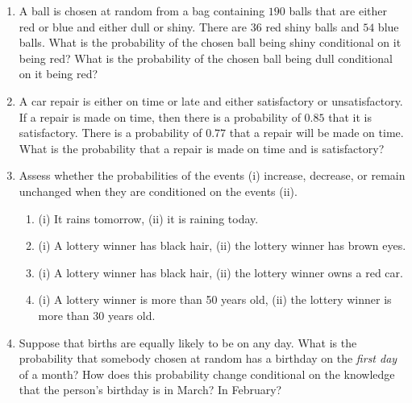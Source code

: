 \documentclass[10pt, twocolumn]{article}
\begin{document}
\begin{enumerate}
    \item[\textbf{1.4.5}] A ball is chosen at random from a bag containing $190$ balls that are either red or blue and either dull or shiny. There are $36$ red shiny balls and $54$ blue balls. What is the probability of the chosen ball being shiny conditional on it being red? What is the probability of the chosen ball being dull conditional on it being red?

    \item[\textbf{1.4.6}] A car repair is either on time or late and either satisfactory or unsatisfactory. If a repair is made on time, then there is a probability of $0.85$ that it is satisfactory. There is a probability of $0.77$ that a repair will be made on time. What is the probability that a repair is made on time and is satisfactory?

    \item[\textbf{1.4.7}] Assess whether the probabilities of the events (i) increase, decrease, or remain unchanged when they are conditioned on the events (ii).
    \begin{enumerate}
        \item[(a)] (i) It rains tomorrow, (ii) it is raining today.
        \item[(b)] (i) A lottery winner has black hair, (ii) the lottery winner has brown eyes.
        \item[(c)] (i) A lottery winner has black hair, (ii) the lottery winner owns a red car.
        \item[(d)] (i) A lottery winner is more than 50 years old, (ii) the lottery winner is more than 30 years old.
    \end{enumerate}

    \item[\textbf{1.4.8}] Suppose that births are equally likely to be on any day. What is the probability that somebody chosen at random has a birthday on the \textit{first day} of a month? How does this probability change conditional on the knowledge that the person's birthday is in March? In February?
\end{enumerate}
\end{document}
